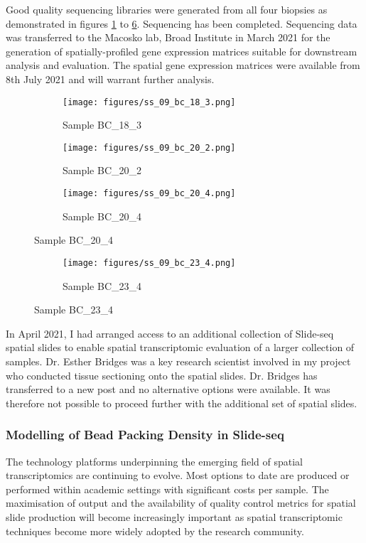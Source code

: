 Good quality sequencing libraries were generated from all four biopsies as demonstrated in figures \ref{fig:ss_09_bc_18_3} to \ref{fig:ss_09_bc_23_4}. Sequencing has been completed. Sequencing data was transferred to the Macosko lab, Broad Institute in March 2021 for the generation of spatially-profiled gene expression matrices suitable for downstream analysis and evaluation. The spatial gene expression matrices were available from 8th July 2021 and will warrant further analysis.

\begin{figure}[ht]
	\begin{subfigure}
		\centering
		\texttt{[image: figures/ss\_09\_bc\_18\_3.png]}  
		\caption{Sample BC\_18\_3}
		\label{fig:ss_09_bc_18_3}
	\end{subfigure}
	\begin{subfigure}
		\centering
		\texttt{[image: figures/ss\_09\_bc\_20\_2.png]}  
		\caption{Sample BC\_20\_2}
		\label{fig:ss_09_bc_20_2}
	\end{subfigure}
	\begin{subfigure}
		\centering
		\texttt{[image: figures/ss\_09\_bc\_20\_4.png]}  
		\caption{Sample BC\_20\_4}
		\label{fig:ss_09_bc_20_4}
	\end{subfigure}
\end{figure}

\begin{figure}[ht]
	\begin{subfigure}
		\centering
		\texttt{[image: figures/ss\_09\_bc\_23\_4.png]}  
		\caption{Sample BC\_23\_4}
		\label{fig:ss_09_bc_23_4}
	\end{subfigure}

\end{figure}

In April 2021, I had arranged access to an additional collection of Slide-seq spatial slides to enable spatial transcriptomic evaluation of a larger collection of samples. 
Dr. Esther Bridges was a key research scientist involved in my project who conducted tissue sectioning onto the spatial slides. Dr. Bridges has transferred to a new post and no alternative options were available. It was therefore not possible to proceed further with the additional set of spatial slides.


\subsubsection{Modelling of Bead Packing Density in Slide-seq}
The technology platforms underpinning the emerging field of spatial transcriptomics are continuing to evolve. Most options to date are produced or performed within academic settings with significant costs per sample. The maximisation of output and the availability of quality control metrics for spatial slide production will become increasingly important as spatial transcriptomic techniques become more widely adopted by the research community.

